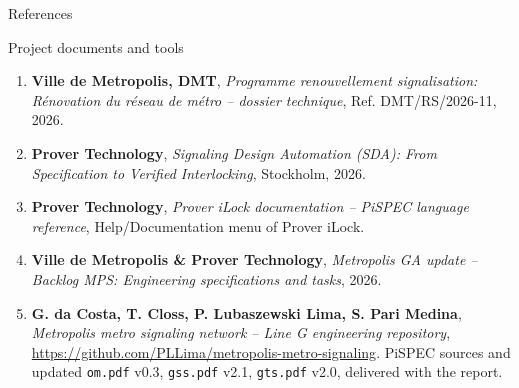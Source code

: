 \documentclass[aspectratio=169,10pt]{beamer}
\begin{document}
\begin{frame}{References}{}
  \vspace*{1.5mm}
  \begin{proverbox}{Project documents and tools}
    \fontsize{7.2}{8.8}\selectfont
    \begin{enumerate}\setlength{\itemsep}{2.5pt}
      \item \textbf{Ville de Metropolis, DMT}, \textit{Programme renouvellement signalisation: Rénovation du réseau de métro -- dossier technique}, Ref. DMT/RS/2026-11, 2026.
      \item \textbf{Prover Technology}, \textit{Signaling Design Automation (SDA): From Specification to Verified Interlocking}, Stockholm, 2026.
      \item \textbf{Prover Technology}, \textit{Prover iLock documentation -- PiSPEC language reference}, Help/Documentation menu of Prover iLock.
      \item \textbf{Ville de Metropolis \& Prover Technology}, \textit{Metropolis GA update -- Backlog MPS: Engineering specifications and tasks}, 2026.
      \item \textbf{G. da Costa, T. Closs, P. Lubaszewski Lima, S. Pari Medina}, \textit{Metropolis metro signaling network -- Line G engineering repository}, \url{https://github.com/PLLima/metropolis-metro-signaling}. PiSPEC sources and updated \texttt{om.pdf} v0.3, \texttt{gss.pdf} v2.1, \texttt{gts.pdf} v2.0, delivered with the report.
    \end{enumerate}
  \end{proverbox}
\end{frame}
\end{document}
